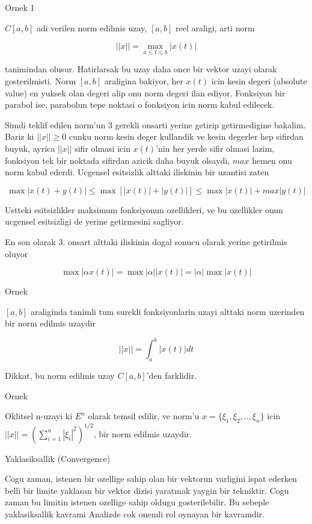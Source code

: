 \documentclass[12pt,fleqn]{article}\usepackage{../common}
\begin{document}
Ornek 1

$C[a,b]$ adi verilen norm edilmis uzay, $[a,b]$ reel araligi, arti norm

\[ ||x|| = \max_{a \le t \le b} |x(t)| \]

tanimindan olusur. Hatirlarsak bu uzay daha once bir vektor uzayi olarak
gosterilmisti. Norm $[a,b]$ araligina bakiyor, her $x(t)$ icin kesin degeri
(absolute value) en yuksek olan degeri alip onu norm degeri ilan
ediyor. Fonksiyon bir parabol ise, parabolun tepe noktasi o fonksiyon icin
norm kabul edilecek. 

Simdi teklif edilen norm'un 3 gerekli onsarti yerine getirip getirmedigine
bakalim. Bariz ki $||x|| \ge 0$ cunku norm kesin deger kullandik ve kesin
degerler hep sifirdan buyuk, ayrica $||x||$ sifir olmasi icin $x(t)$'nin
her yerde sifir olmasi lazim, fonksiyon tek bir noktada sifirdan azicik
daha buyuk olsaydi, $max$ hemen onu norm kabul ederdi. Ucgensel esitsizlik
alttaki iliskinin bir uzantisi zaten

\[ 
\max |x(t) + y(t)| \le 
\max [|x(t)| + |y(t)|] \le
\max |x(t)| + max |y(t)|
\]

Ustteki esitsizlikler maksimum fonksiyonun ozellikleri, ve bu ozellikler
onun ucgensel esitsizligi de yerine getirmesini sagliyor. 

En son olarak 3. onsart alttaki iliskinin dogal sonucu olarak yerine
getirilmis oluyor 

\[ \max |\alpha x(t)|  = \max |\alpha||x(t)| = |\alpha| \max |x(t)|  \]

Ornek

$[a,b]$ araliginda tanimli tum surekli fonksiyonlarin uzayi alttaki norm
uzerinden bir norm edilmis uzaydir

\[ ||x|| = \int _{ a}^{b} |x(t)|dt \]

Dikkat, bu norm edilmis uzay $C[a,b]$'den farklidir. 

Ornek 

Oklitsel n-uzayi ki $E^n$ olarak temsil edilir, ve norm'u $x = \{ \xi_1,
\xi_2, .., \xi_n\}$ 
icin $||x|| = (\sum _{ i=1}^{n} |\xi_i|^2)^{1/2}$, bir norm edilmis uzaydir. 

Yaklasiksallik (Convergence)

Cogu zaman, istenen bir ozellige sahip olan bir vektorun varligini ispat
ederken belli bir limite yaklasan bir vektor dizisi yaratmak yaygin bir
tekniktir. Cogu zaman bu limitin istenen ozellige sahip oldugu
gosterilebilir. Bu sebeple yaklasiksallik kavrami Analizde cok onemli rol
oynayan bir kavramdir. 
\end{document}
